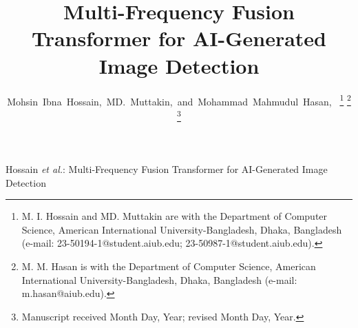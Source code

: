 \documentclass[journal]{IEEEtran}
\begin{document}
\title{Multi-Frequency Fusion Transformer for AI-Generated Image Detection}

\author{Mohsin~Ibna~Hossain,~MD.~Muttakin,~and~Mohammad~Mahmudul~Hasan,~%
\thanks{M. I. Hossain and MD. Muttakin are with the Department of Computer Science, American International University-Bangladesh, Dhaka, Bangladesh (e-mail: 23-50194-1@student.aiub.edu; 23-50987-1@student.aiub.edu).}%
\thanks{M. M. Hasan is with the Department of Computer Science, American International University-Bangladesh, Dhaka, Bangladesh (e-mail: m.hasan@aiub.edu).}%
\thanks{Manuscript received Month Day, Year; revised Month Day, Year.}}

%
{Hossain \MakeLowercase{\textit{et al.}}: Multi-Frequency Fusion Transformer for AI-Generated Image Detection}

\maketitle
\end{document}
